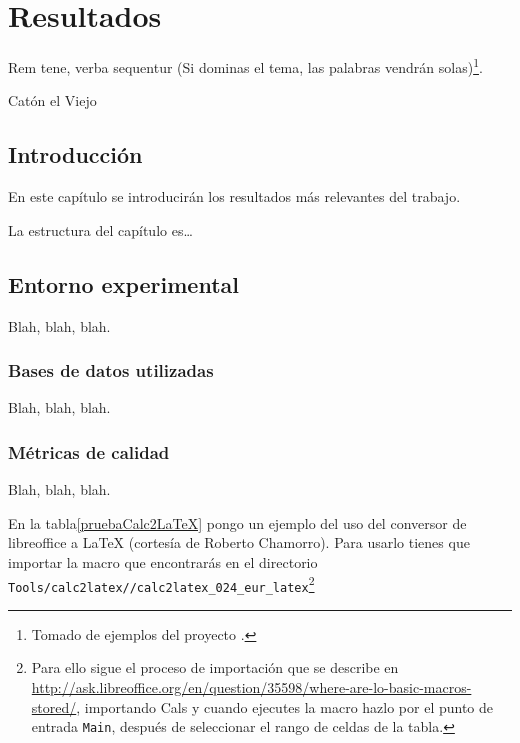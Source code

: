 
\chapter{Resultados}
\label{cha:resultados}


\begin{FraseCelebre}
  \begin{Frase}
    Rem tene, verba sequentur (Si dominas el tema, las palabras vendrán
    solas)\footnote{Tomado de ejemplos del proyecto \texis{}.}.
  \end{Frase}
  \begin{Fuente}
    Catón el Viejo
  \end{Fuente}
\end{FraseCelebre}

\section{Introducción}
\label{sec:introduccion-resultados}

En este capítulo se introducirán los resultados más relevantes del
trabajo. 

La estructura del capítulo es\ldots


\section{Entorno experimental}
\label{sec:entorno-experimental}

Blah, blah, blah.


\subsection{Bases de datos utilizadas}
\label{sec:bases-de-datos-1}

Blah, blah, blah.


\subsection{Métricas de calidad}
\label{sec:metricas-de-calidad}

Blah, blah, blah.

En la tabla\ref{pruebaCalc2LaTeX} pongo un ejemplo del uso del conversor
de libreoffice a \LaTeX{} (cortesía de Roberto Chamorro). Para usarlo
tienes que importar la macro que encontrarás en el directorio
\texttt{Tools/calc2latex//calc2latex\_024\_eur\_latex}\footnote{Para
  ello sigue el proceso de importación que se describe en
  \url{http://ask.libreoffice.org/en/question/35598/where-are-lo-basic-macros-stored/},
  importando Cals
  y cuando ejecutes la macro hazlo por el punto de entrada
  \texttt{Main}, después de seleccionar el rango de celdas de la tabla.}

